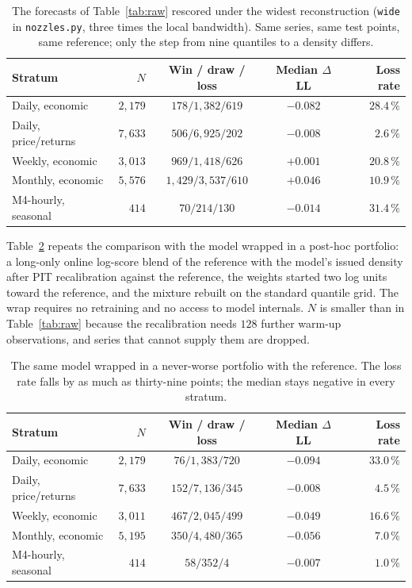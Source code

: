 \documentclass[article]{jss}
\providecommand{\code}[1]{\texttt{#1}}
\begin{document}
\begin{table}[t!]
\centering
\begin{tabular}{lrccr}
\toprule
Stratum & $N$ & Win / draw / loss & Median $\Delta$LL & Loss rate \\
\midrule
Daily, economic       & $2{,}179$ & $178 / 1{,}382 / 619$     & $-0.082$ & $28.4\,\%$ \\
Daily, price/returns  & $7{,}633$ & $506 / 6{,}925 / 202$     & $-0.008$ & $2.6\,\%$ \\
Weekly, economic      & $3{,}013$ & $969 / 1{,}418 / 626$     & $+0.001$ & $20.8\,\%$ \\
Monthly, economic     & $5{,}576$ & $1{,}429 / 3{,}537 / 610$ & $+0.046$ & $10.9\,\%$ \\
M4-hourly, seasonal   & $414$     & $70 / 214 / 130$          & $-0.014$ & $31.4\,\%$ \\
\bottomrule
\end{tabular}
\caption{The forecasts of Table~\ref{tab:raw} rescored under the widest
reconstruction (\code{wide} in \code{nozzles.py}, three times the local
bandwidth). Same series, same test points, same reference; only the step from
nine quantiles to a density differs.}
\label{tab:wide}
\end{table}

Table~\ref{tab:wrapped} repeats the comparison with the model wrapped in a
post-hoc portfolio: a long-only online log-score blend of the reference with
the model's issued density after PIT recalibration against the reference, the
weights started two log units toward the reference, and the mixture rebuilt on
the standard quantile grid. The wrap requires no retraining and no access to
model internals. $N$ is smaller than in Table~\ref{tab:raw} because the
recalibration needs $128$ further warm-up observations, and series that cannot
supply them are dropped.

\begin{table}[t!]
\centering
\begin{tabular}{lrccr}
\toprule
Stratum & $N$ & Win / draw / loss & Median $\Delta$LL & Loss rate \\
\midrule
Daily, economic       & $2{,}179$ & $76 / 1{,}383 / 720$     & $-0.094$ & $33.0\,\%$ \\
Daily, price/returns  & $7{,}633$ & $152 / 7{,}136 / 345$    & $-0.008$ & $4.5\,\%$ \\
Weekly, economic      & $3{,}011$ & $467 / 2{,}045 / 499$    & $-0.049$ & $16.6\,\%$ \\
Monthly, economic     & $5{,}195$ & $350 / 4{,}480 / 365$    & $-0.056$ & $7.0\,\%$ \\
M4-hourly, seasonal   & $414$     & $58 / 352 / 4$           & $-0.007$ & $1.0\,\%$ \\
\bottomrule
\end{tabular}
\caption{The same model wrapped in a never-worse portfolio with the reference.
The loss rate falls by as much as thirty-nine points; the median stays negative
in every stratum.}
\label{tab:wrapped}
\end{table}
\end{document}
